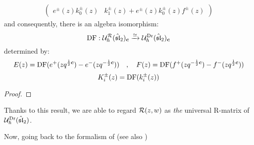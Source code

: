 \begin{lemma}
\begin{equation}
\begin{aligned}
\begin{pmatrix}
                                e^{\pm}(z) k_0^{\pm}(z) & k_1^{\pm}(z) + e^{\pm}(z) k_0^{\pm}(z) f^{\pm}(z)
                            \end{pmatrix}
                    \end{aligned}
                \end{equation}
            and consequently, there is an algebra isomorphism:
                \begin{equation} \label{equation: ding_frenkel_isomorphism_quantum_affine_sl_2}
                    \operatorname{DF}: \mathcal{U}_{\hbar}^{\mathcal{R}}(\hat{\mathfrak{sl}}_2)_{\boldsymbol{c}} \xrightarrow[]{\simeq} \mathcal{U}_{\hbar}^{\mathrm{Dr}}(\hat{\mathfrak{sl}}_2)_{\boldsymbol{c}}
                \end{equation}
            determined by:
                \begin{equation}
                    E(z) = \operatorname{DF}( e^+(z q^{\frac12 \boldsymbol{c}}) - e^-(z q^{-\frac12 \boldsymbol{c}}) ) \quad, \quad F(z) = \operatorname{DF}( f^+(z q^{-\frac12 \boldsymbol{c}}) - f^-(z q^{\frac12 \boldsymbol{c}}) )
                \end{equation}
                \begin{equation}
                    K_i^{\pm}(z) = \operatorname{DF}( k_i^{\pm}(z) )
                \end{equation}
        \end{lemma}
            \begin{proof}
                
            \end{proof}
        Thanks to this result, we are able to regard $\mathcal{R}(z, w)$ as \textit{the} universal R-matrix of $\mathcal{U}_{\hbar}^{\mathrm{Dr}}(\hat{\mathfrak{sl}}_2)$.

        Now, going back to the formalism of \cite{etingof_kazhdan_quantisation_1} (see also \cite{etingof_kazhdan_quantisation_6})

